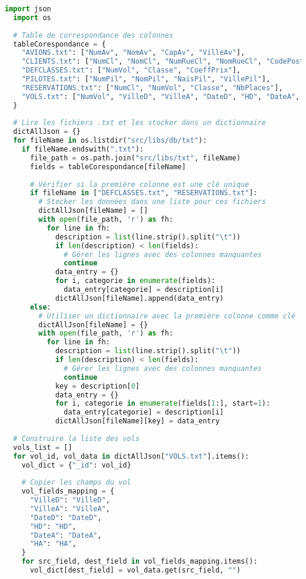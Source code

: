 \begin{lstlisting}[language=Python, caption=Script de création des documents JSON, label=lst:code_json]
  import json
  import os
  
  # Table de correspondance des colonnes
  tableCorespondance = {
    "AVIONS.txt": ["NumAv", "NomAv", "CapAv", "VilleAv"],
    "CLIENTS.txt": ["NumCl", "NomCl", "NumRueCl", "NomRueCl", "CodePosteCl", "VilleCl"],
    "DEFCLASSES.txt": ["NumVol", "Classe", "CoeffPrix"],
    "PILOTES.txt": ["NumPil", "NomPil", "NaisPil", "VillePil"],
    "RESERVATIONS.txt": ["NumCl", "NumVol", "Classe", "NbPlaces"],
    "VOLS.txt": ["NumVol", "VilleD", "VilleA", "DateD", "HD", "DateA", "HA", "NumPil", "NumAv"],
  }
  
  # Lire les fichiers .txt et les stocker dans un dictionnaire
  dictAllJson = {}
  for fileName in os.listdir("src/libs/db/txt"):
    if fileName.endswith(".txt"):
      file_path = os.path.join("src/libs/txt", fileName)
      fields = tableCorespondance[fileName]
  
      # Vérifier si la première colonne est une clé unique
      if fileName in ["DEFCLASSES.txt", "RESERVATIONS.txt"]:
        # Stocker les données dans une liste pour ces fichiers
        dictAllJson[fileName] = []
        with open(file_path, 'r') as fh:
          for line in fh:
            description = list(line.strip().split("\t"))
            if len(description) < len(fields):
              # Gérer les lignes avec des colonnes manquantes
              continue
            data_entry = {}
            for i, categorie in enumerate(fields):
              data_entry[categorie] = description[i]
            dictAllJson[fileName].append(data_entry)
      else:
        # Utiliser un dictionnaire avec la première colonne comme clé
        dictAllJson[fileName] = {}
        with open(file_path, 'r') as fh:
          for line in fh:
            description = list(line.strip().split("\t"))
            if len(description) < len(fields):
              # Gérer les lignes avec des colonnes manquantes
              continue
            key = description[0]
            data_entry = {}
            for i, categorie in enumerate(fields[1:], start=1):
              data_entry[categorie] = description[i]
            dictAllJson[fileName][key] = data_entry
  
  # Construire la liste des vols
  vols_list = []
  for vol_id, vol_data in dictAllJson["VOLS.txt"].items():
    vol_dict = {"_id": vol_id}
  
    # Copier les champs du vol
    vol_fields_mapping = {
      "VilleD": "VilleD",
      "VilleA": "VilleA",
      "DateD": "DateD",
      "HD": "HD",
      "DateA": "DateA",
      "HA": "HA",
    }
    for src_field, dest_field in vol_fields_mapping.items():
      vol_dict[dest_field] = vol_data.get(src_field, "")
  

\end{lstlisting}
